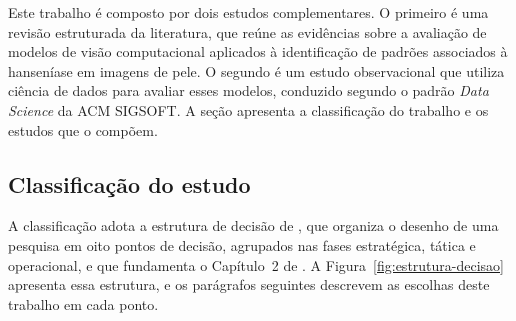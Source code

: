 Este trabalho é composto por dois estudos complementares. O primeiro é uma
revisão estruturada da literatura, que reúne as evidências sobre a avaliação de
modelos de visão computacional aplicados à identificação de padrões associados
à hanseníase em imagens de pele. O segundo é um estudo observacional que
utiliza ciência de dados para avaliar esses modelos, conduzido segundo o
padrão \textit{Data Science} da ACM SIGSOFT. A seção apresenta a
classificação do trabalho e os estudos que o compõem.

\subsection{Classificação do estudo}

A classificação adota a estrutura de decisão de , que
organiza o desenho de uma pesquisa em oito pontos de decisão, agrupados nas
fases estratégica, tática e operacional, e que fundamenta o Capítulo~2 de
. A Figura~\ref{fig:estrutura-decisao} apresenta essa estrutura, e os
parágrafos seguintes descrevem as escolhas deste trabalho em cada ponto.

